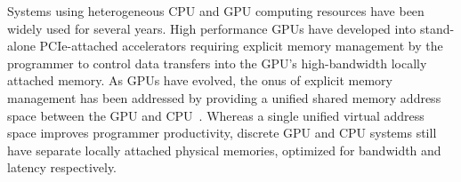 Systems using heterogeneous CPU and GPU computing resources have been widely
used for several years.
High performance GPUs have developed into stand-alone PCIe-attached
accelerators requiring explicit memory management by the programmer to control
data transfers into the GPU's high-bandwidth locally attached memory. As GPUs
have evolved, the onus of explicit memory management has been addressed by
providing a unified shared memory address space between the GPU and
CPU~\cite{UVM,HSA}.  Whereas a single unified virtual address space improves
programmer productivity, discrete GPU and CPU systems still have separate
locally attached physical memories, optimized for bandwidth and latency
respectively. 


